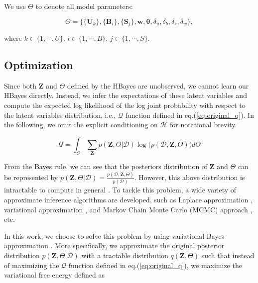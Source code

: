 We use $\Theta$ to denote all model parameters:

\begin{equation*}
\Theta = \Big\{\{\bm{U}_k\}, \{\bm{B}_i\}, \{\bm{S}_j\}, \bm{w}, \boldsymbol{\theta}, \delta_u,\delta_b,\delta_s,\delta_w \Big\},
\end{equation*}

\noindent where $k \in \{1, \cdots, U\}$, $i \in \{1, \cdots, B\}$, $j \in \{1, \cdots, S\}$. 


\subsection{Optimization}

Since both $\mathbf{Z}$ and $\Theta$ defined by the HBayes are unobserved, we cannot learn our HBayes directly. Instead, we infer the expectations of these latent variables and compute the expected log likelihood of the log joint probability with respect to the latent variables distribution, i.e., $\mathcal{Q}$ function defined in eq.(\ref{eq:original_q}). In the following, we omit the explicit conditioning on $\mathcal{H}$ for notational brevity. 

\begin{equation}
\label{eq:original_q}
\mathcal{Q} = \int_\Theta \sum_{\bm{Z}} p(\bm{Z}, \Theta| \mathcal{D})  \log \big( p(\mathcal{D},\bm{Z},\Theta) \big) d\Theta
\end{equation}

From the Bayes rule, we can see that the posteriors distribution of $\mathbf{Z}$ and $\Theta$ can be represented by $p(\bm{Z},\Theta|\mathcal{D}) = \frac{p(\mathcal{D},\bm{Z},\Theta)}{p(\mathcal{D})}$. However, this above distribution is intractable to compute in general \cite{dickey1983multiple}. To tackle this problem, a wide variety of approximate inference algorithms are developed, such as Laplace approximation \cite{rue2009approximate}, variational approximation \cite{bishop2006pattern}, and Markov Chain Monte Carlo (MCMC) approach \cite{blei2003latent}, etc.

In this work, we choose to solve this problem by using variational Bayes approximation \cite{bishop2006pattern}. More specifically, we approximate the original posterior distribution $p(\bm{Z}, \Theta| \mathcal{D})$ with a tractable distribution $q(\bm{Z}, \Theta)$ such that instead of maximizing the $\mathcal{Q}$ function defined in eq.(\ref{eq:original_q}), we maximize the variational free energy defined as 

